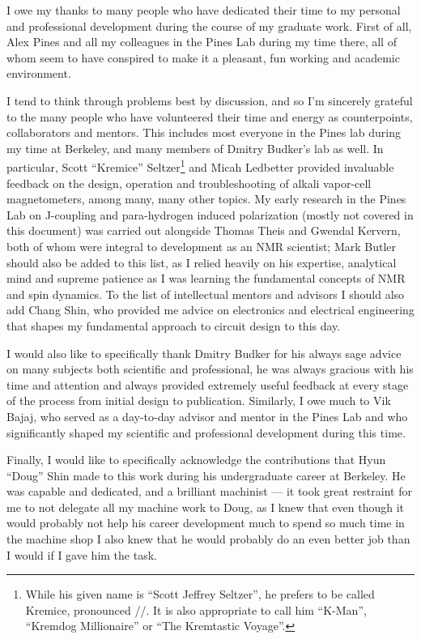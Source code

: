 \documentclass[PaulGanssle-Thesis.tex]{subfiles}
\begin{document}
\begin{acknowledgements}
I owe my thanks to many people who have dedicated their time to my personal and professional development during the course of my graduate work. First of all, Alex Pines and all my colleagues in the Pines Lab during my time there, all of whom seem to have conspired to make it a pleasant, fun working and academic environment.

I tend to think through problems best by discussion, and so I'm sincerely grateful to the many people who have volunteered their time and energy as counterpoints, collaborators and mentors. This includes most everyone in the Pines lab during my time at Berkeley, and many members of Dmitry Budker's lab as well. In particular, Scott ``Kremice'' Seltzer\footnote{While his given name is ``Scott Jeffrey Seltzer'', he prefers to be called Kremice, pronounced //. It is also appropriate to call him ``K-Man'', ``Kremdog Millionaire'' or ``The Kremtastic Voyage''.} and Micah Ledbetter provided invaluable feedback on the design, operation and troubleshooting of alkali vapor-cell magnetometers, among many, many other topics. My early research in the Pines Lab on J-coupling and para-hydrogen induced polarization (mostly not covered in this document) was carried out alongside Thomas Theis and Gwendal Kervern, both of whom were integral to development as an NMR scientist; Mark Butler should also be added to this list, as I relied heavily on his expertise, analytical mind and supreme patience as I was learning the fundamental concepts of NMR and spin dynamics. To the list of intellectual mentors and advisors I should also add Chang Shin, who provided me advice on electronics and electrical engineering that shapes my fundamental approach to circuit design to this day.

I would also like to specifically thank Dmitry Budker for his always sage advice on many subjects both scientific and professional, he was always gracious with his time and attention and always provided extremely useful feedback at every stage of the process from initial design to publication. Similarly, I owe much to Vik Bajaj, who served as a day-to-day advisor and mentor in the Pines Lab and who significantly shaped my scientific and professional development during this time. 

Finally, I would like to specifically acknowledge the contributions that Hyun ``Doug'' Shin made to this work during his undergraduate career at Berkeley. He was capable and dedicated, and a brilliant machinist --- it took great restraint for me to not delegate all my machine work to Doug, as I knew that even though it would probably not help his career development much to spend so much time in the machine shop I also knew that he would probably do an even better job than I would if I gave him the task.

\end{acknowledgements}
\end{document}
